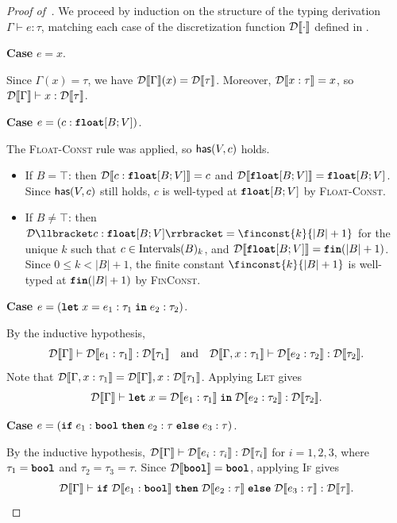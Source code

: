 \begin{proof}[Proof of~]\label{proof:type-transformations}
  \setlength{\parskip}{0.3em plus 0.1em}
  We proceed by induction on the structure of the typing derivation $\Gamma \vdash e : \tau$, matching each case of the discretization function $\discretize{\cdot}$ defined in .

  \par\medskip\noindent
  \textbf{Case} $e = x$.
  \par\nopagebreak
  Since $\Gamma(x) = \tau$, we have $\discretize{\Gamma}(x) = \discretize{\tau}$. Moreover, $\discretize{x : \tau} = x$, so $\discretize{\Gamma} \vdash x : \discretize{\tau}$.

  \par\medskip\noindent
  \textbf{Case} $e = (c : \float[B;V])$.
  \par\nopagebreak
  The \textsc{Float-Const} rule was applied, so $\has{V}{c}$ holds.
  \begin{itemize}[leftmargin=1.5em, itemsep=0.35em, topsep=0.35em]
      \item If $B = \top$: then $\discretize{c : \float[B;V]} = c$ and $\discretize{\float[B;V]} = \float[B;V]$. Since $\has{V}{c}$ still holds, $c$ is well-typed at $\float[B;V]$ by \textsc{Float-Const}.
      \item If $B \neq \top$: then $\discretize{c : \float[B;V]} = \finconst{k}{|B|+1}$ for the unique $k$ such that $c \in \intervals{B}_k$, and $\discretize{\float[B;V]} = \fin{|B|+1}$. Since $0 \leq k < |B|+1$, the finite constant $\finconst{k}{|B|+1}$ is well-typed at $\fin{|B|+1}$ by \textsc{FinConst}.
  \end{itemize}

  \par\medskip\noindent
  \textbf{Case} $e = (\letkw\; x = e_1 : \tau_1 \;\inkw\; e_2 : \tau_2)$.
  \par\nopagebreak
  By the inductive hypothesis,
  \[
      \discretize{\Gamma} \vdash \discretize{e_1 : \tau_1} : \discretize{\tau_1}
      \quad\text{and}\quad
      \discretize{\Gamma, x : \tau_1} \vdash \discretize{e_2 : \tau_2} : \discretize{\tau_2}.
  \]
  Note that $\discretize{\Gamma, x : \tau_1} = \discretize{\Gamma}, x : \discretize{\tau_1}$. Applying \textsc{Let} gives
  \[
      \discretize{\Gamma} \vdash \letkw\; x = \discretize{e_1 : \tau_1} \;\inkw\; \discretize{e_2 : \tau_2} : \discretize{\tau_2}.
  \]

  \par\medskip\noindent
  \textbf{Case} $e = (\ifkw\; e_1 : \bool \;\thenkw\; e_2 : \tau \;\elsekw\; e_3 : \tau)$.
  \par\nopagebreak
  By the inductive hypothesis, $\discretize{\Gamma} \vdash \discretize{e_i : \tau_i} : \discretize{\tau_i}$ for $i = 1, 2, 3$, where $\tau_1 = \bool$ and $\tau_2 = \tau_3 = \tau$. Since $\discretize{\bool} = \bool$, applying \textsc{If} gives
  \[
      \discretize{\Gamma} \vdash \ifkw\; \discretize{e_1 : \bool} \;\thenkw\; \discretize{e_2 : \tau} \;\elsekw\; \discretize{e_3 : \tau} : \discretize{\tau}.
  \]


\end{proof}
